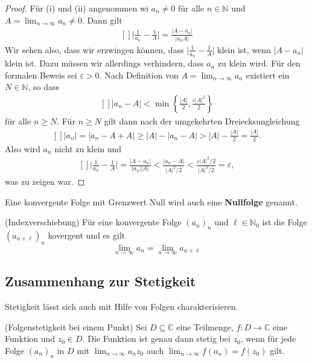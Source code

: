 \documentclass[../Analysis1_script.tex]{subfiles}
\begin{document}
\begin{proof}
	Für (i) und (ii) angenommen wi $a_n \neq 0$ für alle $n \in \mathbb{N}$ und $A = \lim_{n \to \infty} a_n \neq 0$. Dann gilt
	\[\begin{aligned}[]
		\bigg |\frac {1}{a_n}- \frac {1}{A} \bigg | = \frac {|A-a_n|}{|a_nA|}
	\end{aligned}\]
	Wir sehen also, dass wir erzwingen können, dass $\big |\frac {1}{a_n}- \frac {1}{A} \big |$ klein ist, wenn $|A-a_n|$ klein ist. Dazu müssen wir allerdings verhindern, dass $a_n$ zu klein wird. Für den formalen Beweis sei $\varepsilon >0$. Nach Definition von $A=\lim _{n \to \infty }a_n$ existiert ein $N \in \mathbb {N}$, so dass
	\[\begin{aligned}[]
		|a_n-A| < \min \left \lbrace {\frac {|A|}{2},\frac {\varepsilon |A|^2}{2}} \right \rbrace
	\end{aligned}\]
	für alle $n \geq N$. Für $n \geq N$ gilt dann nach der umgekehrten Dreiecksungleichung
	\[\begin{aligned}[]
		|a_n| = |a_n -A + A| \geq |A| - |a_n-A| > |A| - \frac {|A|}{2} = \frac {|A|}{2}.
	\end{aligned}\]
	Also wird $a_n$ nicht zu klein und
	\[\begin{aligned}[]
		\bigg |\frac {1}{a_n}- \frac {1}{A} \bigg | = \frac {|A-a_n|}{|a_n||A|} < \frac {|a_n-A|}{|A|^2/2} < \frac {\varepsilon |A|^2/2}{|A|^2/2} = \varepsilon ,
	\end{aligned}\]
	was zu zeigen war.
\end{proof}

Eine konvergente Folge mit Grenzwert Null wird auch eine \textbf{Nullfolge} genannt.

\begin{lemma}{(Indexverschiebung)}
	Für eine konvergente Folge $(a_n)_n$ und $\ell \in \mathbb{N}_0$ ist die Folge $(a_{n + \ell})_n$ kovergent und es gilt
	\[\lim_{n \to \infty} a_n = \lim_{n \to \infty} a_{n + \ell}\]
\end{lemma}

\subsection{Zusammenhang zur Stetigkeit}

Stetigkeit lässt sich auch mit Hilfe von Folgen charakterisieren.

\begin{proposition}{(Folgenstetigkeit bei einem Punkt)}
	Sei $D \subseteq \mathbb{C}$ eine Teilmenge, $f : D \to \mathbb{C}$ eine Funktion und $z_0 \in D$. Die Funktion ist genau dann stetig bei $z_0$, wenn für jede Folge $(a_n)_n$ in $D$ mit $\lim_{n \to \infty}a_n z_0$ auch $\lim_{n \to \infty}f(a_n) = f(z_0)$ gilt.
\end{proposition}
\end{document}
